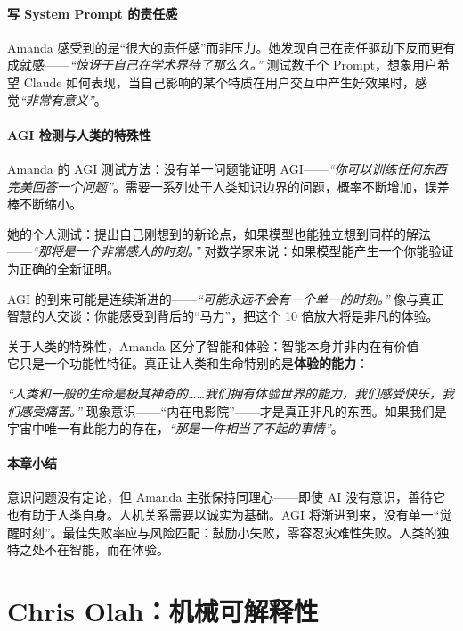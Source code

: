 \documentclass[a4paper]{article}
\begin{document}
\subsection{写 System Prompt 的责任感}

Amanda 感受到的是``很大的责任感''而非压力。她发现自己在责任驱动下反而更有成就感——\textit{``惊讶于自己在学术界待了那么久。''} 测试数千个 Prompt，想象用户希望 Claude 如何表现，当自己影响的某个特质在用户交互中产生好效果时，感觉\textit{``非常有意义''}。

\subsection{AGI 检测与人类的特殊性}

Amanda 的 AGI 测试方法：没有单一问题能证明 AGI——\textit{``你可以训练任何东西完美回答一个问题''}。需要一系列处于人类知识边界的问题，概率不断增加，误差棒不断缩小。

她的个人测试：提出自己刚想到的新论点，如果模型也能独立想到同样的解法——\textit{``那将是一个非常感人的时刻。''} 对数学家来说：如果模型能产生一个你能验证为正确的全新证明。

AGI 的到来可能是连续渐进的——\textit{``可能永远不会有一个单一的时刻。''} 像与真正智慧的人交谈：你能感受到背后的``马力''，把这个 10 倍放大将是非凡的体验。

关于人类的特殊性，Amanda 区分了智能和体验：智能本身并非内在有价值——它只是一个功能性特征。真正让人类和生命特别的是\textbf{体验的能力}：

\textit{``人类和一般的生命是极其神奇的……我们拥有体验世界的能力，我们感受快乐，我们感受痛苦。''} 现象意识——``内在电影院''——才是真正非凡的东西。如果我们是宇宙中唯一有此能力的存在，\textit{``那是一件相当了不起的事情''}。

\subsection{本章小结}

意识问题没有定论，但 Amanda 主张保持同理心——即使 AI 没有意识，善待它也有助于人类自身。人机关系需要以诚实为基础。AGI 将渐进到来，没有单一``觉醒时刻''。最佳失败率应与风险匹配：鼓励小失败，零容忍灾难性失败。人类的独特之处不在智能，而在体验。

\part{Chris Olah：机械可解释性}
\end{document}
